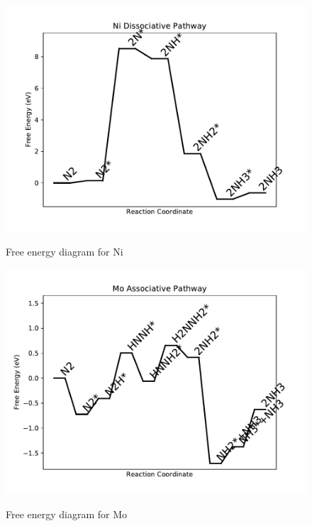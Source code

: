 \documentclass[journal=jacsat,manuscript=article]{achemso}
\begin{document}
\begin{figure}
\includegraphics[width=1\linewidth]{data/plots/Ni_dissociative.pdf}
\label{fig:Ni_dissociative}
\caption{Free energy diagram for Ni}
\end{figure}

\newpage
\begin{figure}
\includegraphics[width=1\linewidth]{data/plots/Mo_associative.pdf}
\label{fig:Mo_associative}
\caption{Free energy diagram for Mo}
\end{figure}
\end{document}
